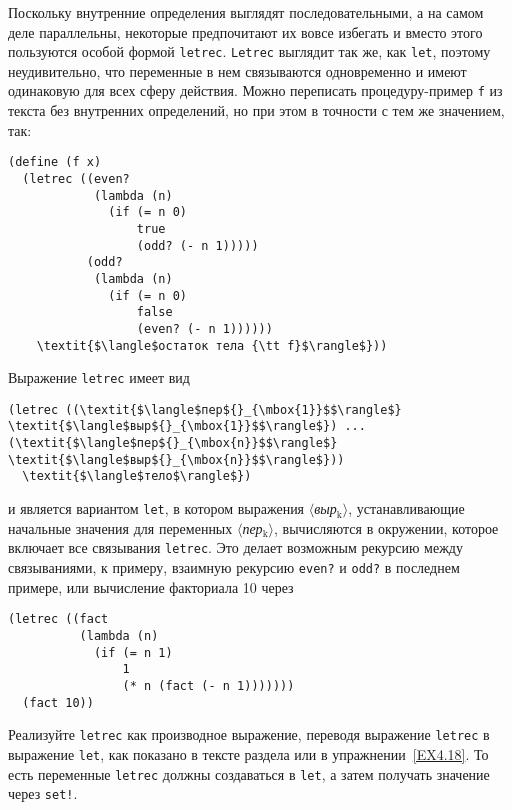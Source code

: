 \begin{exercise}{4.20}%
\label{EX4.20}%
Поскольку внутренние определения выглядят
последовательными, а на самом деле параллельны, некоторые предпочитают
их вовсе избегать и вместо этого пользуются особой формой
{\tt letrec}. {\tt Letrec} выглядит так же, как
{\tt let}, поэтому неудивительно, что переменные в нем
связываются одновременно и имеют одинаковую для всех сферу действия.
Можно переписать процедуру-пример {\tt f} из текста без
внутренних определений, но при этом в точности с тем же значением, так:

\begin{Verbatim}[fontsize=\small]
(define (f x)
  (letrec ((even?
            (lambda (n)
              (if (= n 0)
                  true
                  (odd? (- n 1)))))
           (odd?
            (lambda (n)
              (if (= n 0)
                  false
                  (even? (- n 1))))))
    \textit{$\langle$остаток тела {\tt f}$\rangle$}))
\end{Verbatim}
Выражение {\tt letrec} имеет вид

\begin{Verbatim}[fontsize=\small]
(letrec ((\textit{$\langle$пер${}_{\mbox{1}}$$\rangle$} \textit{$\langle$выр${}_{\mbox{1}}$$\rangle$}) ... (\textit{$\langle$пер${}_{\mbox{n}}$$\rangle$} \textit{$\langle$выр${}_{\mbox{n}}$$\rangle$}))
  \textit{$\langle$тело$\rangle$})
\end{Verbatim}
и является вариантом {\tt let}, в котором выражения
\textit{$\langle$выр${}_{\mbox{k}}$$\rangle$}, устанавливающие
начальные значения для переменных
\textit{$\langle$пер${}_{\mbox{k}}$$\rangle$}, вычисляются в окружении,
которое включает все связывания {\tt letrec}. Это делает возможным
рекурсию между связываниями, к примеру, взаимную рекурсию
{\tt even?} и {\tt odd?} в последнем примере, или
вычисление факториала 10 через

\begin{Verbatim}[fontsize=\small]
(letrec ((fact
          (lambda (n)
            (if (= n 1)
                1
                (* n (fact (- n 1)))))))
  (fact 10))
\end{Verbatim}

\begin{plainenum}


\item
Реализуйте {\tt letrec} как производное
выражение, переводя выражение {\tt letrec} в выражение
{\tt let}, как показано в тексте раздела или в 
упражнении~\ref{EX4.18}.  То есть переменные {\tt letrec}
должны создаваться в {\tt let}, а затем получать значение через
{\tt set!}.


\end{plainenum}
\end{exercise}
